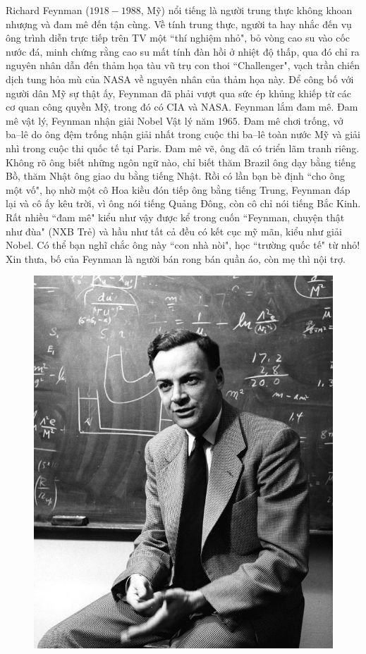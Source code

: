 \begin{multicols}{2}
	Richard Feynman ($1918-1988$, Mỹ) nổi tiếng là người trung thực không khoan nhượng và đam mê đến tận cùng. Về tính trung thực, người ta hay nhắc đến vụ ông trình diễn trực tiếp trên TV một ``thí nghiệm nhỏ", bỏ vòng cao su vào cốc nước đá, minh chứng rằng cao su mất tính đàn hồi ở nhiệt độ thấp, qua đó chỉ ra nguyên nhân dẫn đến thảm họa tàu vũ trụ con thoi ``Challenger", vạch trần chiến dịch tung hỏa mù của NASA về nguyên nhân của thảm họa này. Để công bố với người dân Mỹ sự thật ấy, Feynman đã phải vượt qua sức ép khủng khiếp từ các cơ quan công quyền Mỹ, trong đó có CIA và NASA. 
	\vskip 0.1cm
	Feynman lắm đam mê. Đam mê vật lý, Feynman nhận giải Nobel Vật lý năm $1965$. Đam mê chơi trống, vở ba--lê do ông đệm trống nhận giải nhất trong cuộc thi ba--lê toàn nước Mỹ và giải nhì trong cuộc thi quốc tế tại Paris. Đam mê vẽ, ông đã có triển lãm tranh riêng. Không rõ ông biết những ngôn ngữ nào, chỉ biết thăm Brazil ông dạy bằng tiếng Bồ, thăm Nhật ông giao du bằng tiếng Nhật. Rồi có lần bạn bè định ``cho ông một vố", họ nhờ một cô Hoa kiều đón tiếp ông bằng tiếng Trung, Feynman đáp lại và cô ấy kêu trời, vì ông nói tiếng Quảng Đông, còn cô chỉ nói tiếng Bắc Kinh. Rất nhiều ``đam mê" kiểu như vậy được kể trong cuốn ``Feynman, chuyện thật như đùa" (NXB Trẻ) và hầu như tất cả đều có kết cục mỹ mãn, kiểu như giải Nobel. Có thể bạn nghĩ chắc ông này ``con nhà nòi", học ``trường quốc tế" từ nhỏ! Xin thưa, bố của Feynman là người bán rong bán quần áo, còn mẹ thì nội trợ. 
	\begin{figure}[H]
		\vspace*{-5pt}
		\centering
		\captionsetup{labelformat= empty, justification=centering}
		\includegraphics[width= 1\linewidth]{1a}

\end{figure}
\end{multicols}
